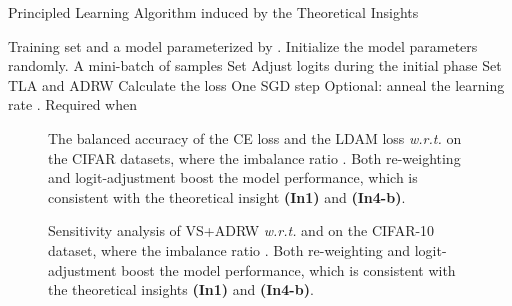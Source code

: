 \begin{algorithm}[t]
    \caption{Principled Learning Algorithm induced by the Theoretical Insights}
    \label{alg:algorithm}
    \begin{algorithmic}[1]
        \REQUIRE Training set  and a model  parameterized by .
        \STATE Initialize the model parameters  randomly.
        \FOR{}
            \STATE  \hfill  A mini-batch of  samples
            \IF {} 
                \STATE Set  \hfill  Adjust logits during the initial phase
            \ELSE 
                \STATE Set  \hfill  TLA and ADRW
            \ENDIF
            \STATE  \hfill  Calculate the loss
            \STATE  \hfill  One SGD step
            \STATE Optional: anneal the learning rate . \hfill  Required when 
        \ENDFOR
    \end{algorithmic} 
\end{algorithm}

\begin{figure}[t]
    \centering
    \caption{The balanced accuracy of the CE loss and the LDAM loss \textit{w.r.t.}  on the CIFAR datasets, where the imbalance ratio . Both re-weighting and logit-adjustment boost the model performance, which is consistent with the theoretical insight \textbf{(In1)} and \textbf{(In4-b)}.}
    \label{fig:alpha}
\end{figure}

\begin{figure}[!t]
    \centering
    \caption{Sensitivity analysis of VS+ADRW \textit{w.r.t.}  and  on the CIFAR-10 dataset, where the imbalance ratio . Both re-weighting and logit-adjustment boost the model performance, which is consistent with the theoretical insights \textbf{(In1)} and \textbf{(In4-b)}.}
    \label{fig:sensitivity_cifar10}
\end{figure}

